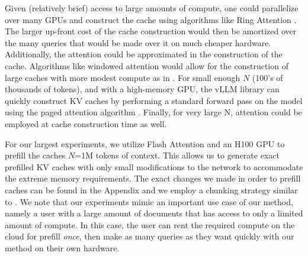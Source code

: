 Given (relatively brief) access to large amounts of compute, one could parallelize over many GPUs and construct the cache using algorithms like Ring Attention \cite{liu2023ringattentionblockwisetransformers}. The larger up-front cost of the cache construction would then be amortized over the many queries that would be made over it on much cheaper hardware. Additionally, the attention could be approximated in the construction of the cache. Algorithms like windowed attention would allow for the construction of large caches with more modest compute as in \cite{child2019generatinglongsequencessparse}. For small enough $N$ (100's of thousands of tokens), and with a high-memory GPU, the vLLM library can quickly construct KV caches by performing a standard forward pass on the model using the paged attention algorithm \cite{kwon2023efficient}. Finally, for very large N, \topk attention could be employed at cache construction time as well. 

For our largest experiments, we utilize Flash Attention and an H100 GPU to prefill the caches $N$=1M tokens of context. This allows us to generate exact prefilled KV caches with only small modifications to the network to accommodate the extreme memory requirements. The exact changes we made in order to prefill caches can be found in the Appendix and we employ a chunking strategy similar to \cite{guptaMemoryefficientTransformersTopk2021}. We note that our experiments mimic an important use case of our method, namely a user with a large amount of documents that has access to only a limited amount of compute. In this case, the user can rent the required compute on the cloud for prefill \emph{once}, then make as many queries as they want quickly with our method on their own hardware.


